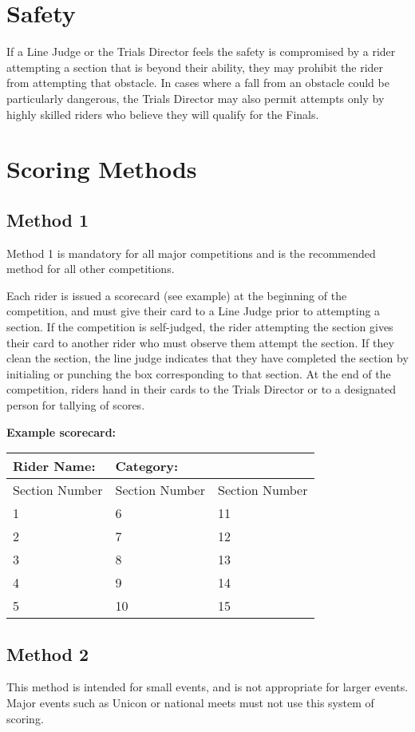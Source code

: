 \section{Safety}

If a Line Judge or the Trials Director feels the safety is compromised by a rider attempting a section that is beyond their ability, they may prohibit the rider from attempting that obstacle.
In cases where a fall from an obstacle could be particularly dangerous, the Trials Director may also permit attempts only by highly skilled riders who believe they will qualify for the Finals.

\section{Scoring Methods}

\subsection{Method 1}
Method 1 is mandatory for all major competitions and is the recommended method for all other competitions.

Each rider is issued a scorecard (see example) at the beginning of the competition, and must give their card to a Line Judge prior to attempting a section.
If the competition is self-judged, the rider attempting the section gives their card to another rider who must observe them attempt the section.
If they clean the section, the line judge indicates that they have completed the section by initialing or punching the box corresponding to that section.
At the end of the competition, riders hand in their cards to the Trials Director or to a designated person for tallying of scores.

\textbf{Example scorecard:}

\begin{tabular}{|l|l|l|}
\hline
\textbf{Rider Name:} & \textbf{Category:} & \\
\hline
Section Number & Section Number & Section Number \\
\hline
1 & 6 & 11 \\
\hline
2 & 7 & 12 \\
\hline
3 & 8 & 13 \\
\hline
4 & 9 & 14 \\
\hline
5 & 10 & 15 \\
\hline
\end{tabular}

\subsection{Method 2}
This method is intended for small events, and is not appropriate for larger events.
Major events such as Unicon or national meets must not use this system of scoring.

